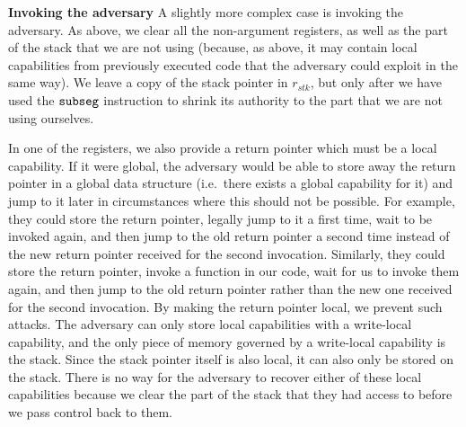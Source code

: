 \documentclass[format=acmsmall, review=true, screen=true]{acmart}
\renewcommand{\sectionname}{Section}
\newcommand\lau[1]{{\color{purple} \sf \footnotesize {LS: #1}}\\}
\renewcommand\lau[1]{}
\newcommand{\var}[1]{\mathit{#1}}
\newcommand{\stk}{\var{stk}}
\newcommand{\zinstr}[1]{\mathtt{#1}}
\newcommand{\threeinstr}[4]{
  \ifthenelse{\equal{#2#3#4}{}}
  {\zinstr{#1}}
  {\zinstr{#1} \; #2 \; #3 \; #4}
}
\newcommand{\subseg}[3]{\threeinstr{subseg}{#1}{#2}{#3}}
\begin{document}
\textbf{Invoking the adversary} A slightly more complex case is invoking the
adversary. As above, we clear all the non-argument registers, as well as the
part of the stack that we are not using (because, as above, it may contain local
capabilities from previously executed code that the adversary could exploit in
the same way). We leave a copy of the stack pointer in $r_\stk$, but only after
we have used the $\subseg{}{}{}$ instruction to shrink its authority to the part
that we are not using ourselves.

In one of the registers, we also provide a return pointer which must be a local
capability. If it were global, the adversary would be able to store away the
return pointer in a global data structure (i.e.\ there exists a global capability for it) and jump to it later in
circumstances where this should not be possible. For example, they could store
the return pointer, legally jump to it a first time, wait to be invoked again,
and then jump to the old return pointer a second time instead of the new return
pointer received for the second invocation. Similarly, they could store the
return pointer, invoke a function in our code, wait for us to invoke them again,
and then jump to the old return pointer rather than the new one received for the
second invocation.
%
By making the return pointer local, we prevent such attacks.
The adversary can only store local capabilities with a write-local capability, and the only piece of memory governed by a write-local capability is the stack.
Since the stack pointer itself is also local, it can also only be stored on the stack.
There is no way for the adversary to recover either of these local capabilities because we clear the part of the stack that they had access to before we pass control back to them.
\end{document}
